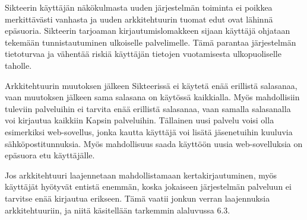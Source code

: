 Sikteerin käyttäjän näkökulmasta uuden järjestelmän toiminta ei poikkea merkittävästi vanhasta ja uuden arkkitehtuurin tuomat edut ovat lähinnä epäsuoria. Sikteerin tarjoaman kirjautumislomakkeen sijaan käyttäjä ohjataan tekemään tunnistautuminen ulkoiselle palvelimelle. Tämä parantaa järjestelmän tietoturvaa ja vähentää riskiä käyttäjän tietojen vuotamisesta ulkopuoliselle taholle.

Arkkitehtuurin muutoksen jälkeen Sikteerissä ei käytetä enää erillistä salasanaa, vaan muutoksen jälkeen sama salasana on käytössä kaikkialla. Myös mahdollisiin tuleviin palveluihin ei tarvita enää erillistä salasanaa, vaan samalla salasanalla voi kirjautua kaikkiin Kapsin palveluihin. Tällainen uusi palvelu voisi olla esimerkiksi web-sovellus, jonka kautta käyttäjä voi lisätä jäsenetuihin kuuluvia sähköpostitunnuksia. Myös mahdollisuus saada käyttöön uusia web-sovelluksia on epäsuora etu käyttäjälle.

Jos arkkitehtuuri laajennetaan mahdollistamaan kertakirjautuminen, myös käyttäjät hyötyvät entistä enemmän, koska jokaiseen järjestelmän palveluun ei tarvitse enää kirjautua erikseen. Tämä vaatii jonkun verran laajennuksia arkkitehtuuriin, ja niitä käsitellään tarkemmin alaluvussa 6.3.
